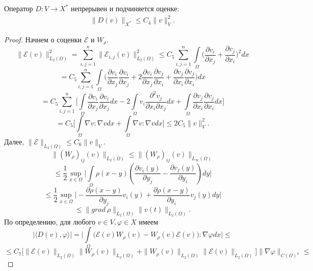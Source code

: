 \begin{lemma}\label{lm:3.5}
    Оператор $D:V\rightarrow X^*$ непрерывен и подчиняется оценке:
    \begin{equation}\label{eq:3.4}
        \begin{gathered}
            \parallel D(v)\parallel_{X^*} \leqslant C_4\parallel v\parallel^2_V.
        \end{gathered}
    \end{equation}
\end{lemma}

\begin{proof}
    Начнем о соценки $\mathcal{E}$ и $W_{\rho}$.
    $$\parallel\mathcal{E}(v)\parallel^2_{L_2(\Omega)}=\sum_{i,j=1}^n \parallel\mathcal{E}_{i,j}(v)\parallel^2_{L_2(\Omega)}
    \leqslant C_5 \sum_{i,j=1}^n\int\limits_{\Omega}\bigg(\frac{\partial v_i}{\partial x_j}+\frac{\partial v_j}{\partial x_i}\bigg)^2 dx$$
    $$=C_5\sum_{i,j=1}^n\int\limits_{\Omega}\bigg(\frac{\partial v_i}{\partial x_j}\frac{\partial v_i}{\partial x_j}+
    2\frac{\partial v_i}{\partial x_j}\frac{\partial v_j}{\partial x_i}+\frac{\partial v_j}{\partial x_i}\frac{\partial v_j}{\partial x_i}\bigg)dx$$
    $$=C_5\sum_{i,j=1}^n\bigg[\int\limits_{\Omega}\frac{\partial v_i}{\partial x_j}\frac{\partial v_i}{\partial x_j}dx-
    2\int\limits_{\Omega} v_i\frac{\partial^2 v_j}{\partial x_i\partial x_j}dx+\int\limits_{\Omega}\frac{\partial v_j}{\partial x_i}\frac{\partial v_j}{\partial x_i}dx\bigg]$$
    $$=C_5\bigg[\int\limits_{\Omega}\nabla v : \nabla v dx +\int\limits_{\Omega}\nabla v : \nabla v dx\bigg]\leqslant
    2C_5\parallel v\parallel^2_V.$$
    Далее, $\parallel\mathcal{E}\parallel_{L_2(\Omega)}\leqslant C_6\parallel v\parallel_V$.
    $$\parallel(W_{\rho})_{ij}(v)\parallel_{L_2(\Omega)}\leqslant\parallel(W_{\rho})_{ij}(v)\parallel_{L_{\infty}(\Omega)}$$
    $$\leqslant \frac{1}{2} \sup_{x\in\Omega}\bigg|\int\limits_{\Omega}\rho (x-y)(\frac{\partial v_i(y)}{\partial y_j}-\frac{\partial v_j(y)}{\partial y_i})dy\bigg|$$
    $$\leqslant \frac{1}{2}\sup\limits_{x\in\Omega} \bigg|-\frac{\partial\rho (x-y)}{\partial y_j}v_i(y)+\frac{\partial\rho (x-y)}{\partial y_i}v_j(y)dy\bigg|$$
    $$\leqslant\parallel grad \ \rho\parallel_{L_2(\Omega)}\parallel v(t)\parallel_{L_2(\Omega)}.$$
    По определению, для любого $v\in V, \varphi\in X$ имеем
    $$\mid\langle D(v),\varphi\rangle\mid=\bigg|\int\limits_{\Omega}\bigg(\mathcal{E}(v)W_{\rho}(v)-W_{\rho}(v)\mathcal{E}(v)\bigg):\nabla\varphi dx\bigg|\leqslant$$
    $$\leqslant C_7\bigg[\|\mathcal{E}(v)\|_{L_2(\Omega)}\|W_{\rho}(v)\|_{L_2(\Omega)}+\|W_{\rho}(v)\|_{L_2(\Omega)}\|\mathcal{E}(v)\|_{L_2(\Omega)}\bigg]\|\nabla\varphi\|_{C(\Omega)^n}\leqslant$$

\end{proof}

